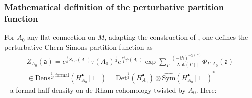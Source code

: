 \documentclass[11pt,a4paper]{amsart}
\theoremstyle{plain} %
\theoremstyle{definition}
\theoremstyle{remark}
\newcommand{\mr}{\mathrm}
\newcommand{\sfa}{\mathsf{a}}
\newcommand{\bt}{\bullet}
\newcommand{\wh}{\widehat}
\begin{document}
\subsubsection{Mathematical definition of the perturbative partition function}
For $A_0$ any flat connection %
on $M$, adapting the construction of \cite{Cattaneo2008}, one defines 
the perturbative Chern-Simons partition function as 
\begin{multline}\label{Zpert}
    Z_{A_0}(\sfa)=e^{\frac{i}{\hbar}S_{CS}(A_0)} \tau(A_0)^\frac{1}{2} e^{\frac{\pi i}{4}\psi(A_0)} \exp \sum_\Gamma \frac{(-i\hbar)^{-\chi(\Gamma)}}{|\mr{Aut}(\Gamma)|}\Phi_{\Gamma,A_0}(\sfa) \\ 
    \in \mr{Dens}^{\frac12,\mr{formal}}(H^\bt_{A_0}[1])=\mr{Det}^\frac12(H^\bt_{A_0})\otimes \wh{\mr{Sym}}(H^\bt_{A_0}[1])^*
\end{multline}
-- a formal half-density on de Rham cohomology twisted by $A_0$. Here:
\end{document}
